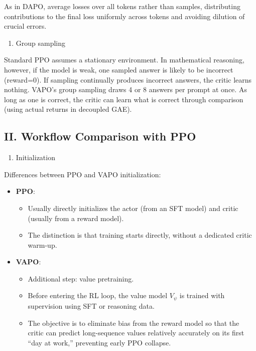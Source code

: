 As in DAPO, average losses over all tokens rather than samples, distributing contributions to the final loss uniformly across tokens and avoiding dilution of crucial errors.

\begin{enumerate}
\def\labelenumi{\arabic{enumi}.}
\setcounter{enumi}{4}
\tightlist
\item
  Group sampling
\end{enumerate}

Standard PPO assumes a stationary environment. In mathematical reasoning, however, if the model is weak, one sampled answer is likely to be incorrect (reward=0). If sampling continually produces incorrect answers, the critic learns nothing. VAPO's group sampling draws 4 or 8 answers per prompt at once. As long as one is correct, the critic can learn what is correct through comparison (using actual returns in decoupled GAE).

\hypertarget{ii.-workflow-comparison-with-ppo}{%
\subsection{II. Workflow Comparison with PPO}\label{ii.-workflow-comparison-with-ppo}}

\begin{enumerate}
\def\labelenumi{\arabic{enumi}.}
\tightlist
\item
  Initialization
\end{enumerate}

Differences between PPO and VAPO initialization:

\begin{itemize}
\tightlist
\item
{}
  \textbf{PPO}:

  \begin{itemize}
  \tightlist
  \item
    Usually directly initializes the actor (from an SFT model) and critic (usually from a reward model).
  \item
    The distinction is that training starts directly, without a dedicated critic warm-up.
  \end{itemize}
\item
{}
  \textbf{VAPO}:

  \begin{itemize}
  \tightlist
  \item
    Additional step: value pretraining.
  \item
    Before entering the RL loop, the value model \(V_\psi\) is trained with supervision using SFT or reasoning data.
  \item
    The objective is to eliminate bias from the reward model so that the critic can predict long-sequence values relatively accurately on its first ``day at work,'' preventing early PPO collapse.
  \end{itemize}
\end{itemize}

